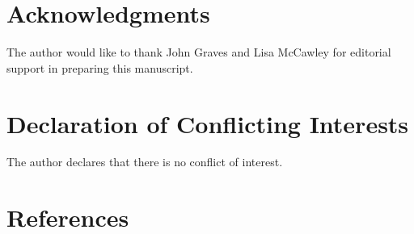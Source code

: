 \documentclass[]{article}
\begin{document}
\section{Acknowledgments}

The author would like to thank John Graves and Lisa McCawley for editorial support in preparing this manuscript.

\section{Declaration of Conflicting Interests}

The author declares that there is no conflict of interest.

\section{References}
\end{document}

